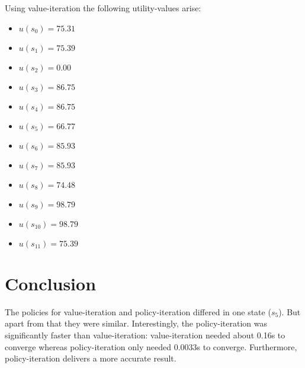 \documentclass[a4paper]{article}
\begin{document}
\noindent
Using value-iteration the following utility-values arise:
\begin{multicols}{2}
\begin{itemize}
\item $u(s_0) = 75.31 $
\item $u(s_1) = 75.39 $
\item $u(s_2) = 0.00 $
\item $u(s_3) = 86.75 $
\item $u(s_4) = 86.75 $
\item $u(s_5) = 66.77 $
\item $u(s_6) = 85.93 $
\item $u(s_7) = 85.93 $
\item $u(s_8) = 74.48 $
\item $u(s_9) = 98.79 $
\item $u(s_{10}) = 98.79 $
\item $u(s_{11}) = 75.39 $
\end{itemize}
\end{multicols}

\section{Conclusion}
The policies for value-iteration and policy-iteration differed in one state ($s_5$). But apart from that they were similar. Interestingly, the policy-iteration was significantly faster than value-iteration: value-iteration needed about 0.16s to converge whereas policy-iteration only needed 0.0033s to converge. Furthermore, policy-iteration delivers a more accurate result.
\end{document}
